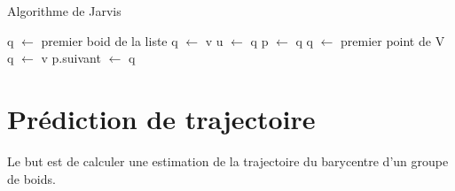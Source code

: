 \documentclass{article}
\begin{document}
\begin{algorithm}[H]
    \caption{Algorithme de Jarvis}
    \begin{algorithmic}
        \STATE q $\leftarrow$ premier boid de la liste
        \medbreak
        \STATE q $\leftarrow$ v
        \ENDIF
        \ENDFOR
        \medbreak
        \STATE u $\leftarrow$ q
        \STATE p $\leftarrow$ q
        \medbreak
        \STATE q $\leftarrow$ premier point de V
        \medbreak
        \medbreak
        \STATE q $\leftarrow$ v
        \ENDIF
        \ENDFOR
        \medbreak
        \STATE p.suivant $\leftarrow$ q
        \ENDWHILE

    \end{algorithmic}
\end{algorithm}

\section{Prédiction de trajectoire}

Le but est de calculer une estimation de la trajectoire du barycentre d’un groupe de boids.
\end{document}
